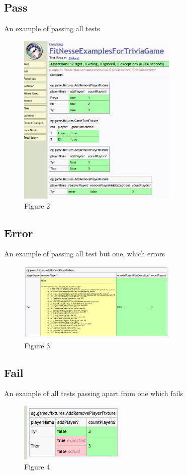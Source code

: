 \documentclass{article}
\begin{document}
\subsection{Pass}
An example of passing all tests
\begin{figure}[h]
\centering
        \includegraphics[width=3.0in] {figures/Screenshot2.png}
        \caption{Figure 2}
        \label{Pass}
\end{figure}

\subsection{Error}
An example of passing all test but one, which errors
\begin{figure}[h]
\centering
        \includegraphics[width=3.0in] {figures/Screenshot3.png}
        \caption{Figure 3}
        \label{Error}
\end{figure}

\subsection{Fail}
An example of all tests passing apart from one which fails
\begin{figure}[h]
\centering
        \includegraphics[width=2.0in] {figures/Screenshot4.png}
        \caption{Figure 4}
        \label{Fail}
\end{figure}
\end{document}
